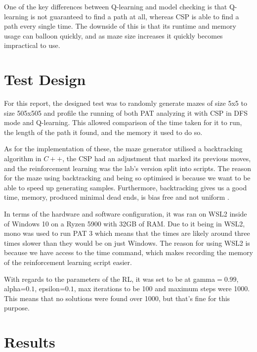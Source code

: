 \documentclass{article}
\newcommand\tab[1][1cm]{\hspace*{#1}}
\begin{document}
        \tab One of the key differences between Q-learning and model checking is 
        that Q-learning is not guaranteed to find a path at all, whereas CSP 
        is able to find a path every single time. The downside of this is 
        that its runtime and memory usage can balloon quickly, and as maze 
        size increases it quickly becomes impractical to use.

    \section{Test Design}\label{sec:test-design}
        For this report, the designed test was to randomly generate mazes of 
        size 5x5 to size 505x505 and profile the running of both PAT analyzing 
        it with CSP in DFS mode and Q-learning. This allowed comparison of 
        the time taken for it to run, the length of the path it found, and 
        the memory it used to do so.

        \tab As for the implementation of these, the maze generator utilised a
        backtracking algorithm in $C++$, the CSP had an adjustment that marked its
        previous moves, and the reinforcement learning was the lab's version
        split into scripts. The reason for the maze using backtracking and being
        so optimised is because we want to be able to speed up generating
        samples. Furthermore, backtracking gives us a good time, memory,
        produced minimal dead ends, is bias free and not uniform 
        \cite{source}.

        \tab In terms of the hardware and software configuration, it was ran on
        WSL2 inside of Windows 10 on a Ryzen 5900 with 32GB of RAM. Due to it
        being in WSL2, mono was used to run PAT 3 which means that the times are
        likely around three times slower than they would be on just Windows. 
        The reason for using WSL2 is because we have access to the time command,
        which makes recording the memory of the reinforcement learning script
        easier. 

        \tab With regards to the parameters of the RL, it was set to be at 
        gamma$=0.99$, alpha=$0.1$, epsilon=$0.1$, max iterations to be 100 
        and maximum steps were 1000. This means that no solutions were found
        over 1000, but that's fine for this purpose.

    \section{Results}\label{sec:results}
\end{document}
